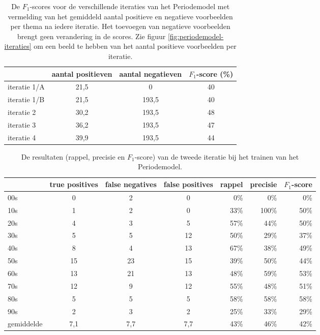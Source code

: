 \begin{table}
	\centering
	\renewcommand\arraystretch{1.2}
	\begin{tabular}{l|cc|c}
		\toprule
		& aantal positieven  &  aantal negatieven &  $F_1$-score (\%)\\
		\midrule
		iteratie 1/A & 21,5 & 0 & 40 \\
		iteratie 1/B & 21,5 & 193,5 & 40 \\
		iteratie 2 & 30,2 & 193,5 & 48 \\
		iteratie 3 & 36,2 & 193,5 & 47 \\
		iteratie 4 & 39,9 & 193,5 & 44 \\
		\bottomrule
	\end{tabular}
	\caption[$F_1$-scores voor de verschillende iteraties van het Periodemodel]{De $F_1$-scores voor de verschillende iteraties van het Periodemodel met vermelding van het gemiddeld aantal positieve en negatieve voorbeelden per thema na iedere iteratie. Het toevoegen van negatieve voorbeelden brengt geen verandering in de scores. Zie figuur \ref{fig:periodemodel-iteraties} om een beeld te hebben van het aantal positieve voorbeelden per iteratie.}
	\label{tab:validatie-periodemodel}
\end{table}

\begin{table}
	\centering
	\renewcommand\arraystretch{1.2}
	\begin{tabular}{l|ccc|rrr}
		\toprule
		& true positives  & false negatives & false positives & rappel & precisie & $F_1$-score \\ 
		\midrule
		00s & 0 & 2 & 0 & 0\% & 0\% & 0\% \\ 
		10s & 1 & 2 & 0 &  33\% & 100\% & 50\% \\ 
		20s & 4 & 3 & 5 & 57\% & 44\% & 50\% \\ 
		30s & 5 & 5 & 12 & 50\% & 29\% & 37\% \\ 
		40s & 8 & 4 & 13  & 67\% & 38\% & 49\% \\ 
		50s & 15 & 23 & 15  & 39\% & 50\% & 44\% \\ 
		60s & 13 & 21 & 13  & 48\% & 59\% & 53\% \\ 
		70s & 12 & 9 & 12  & 55\% & 48\% & 51\% \\ 
		80s & 5 & 5 & 5  & 58\% & 58\% & 58\% \\ 
		90s & 2 & 3 & 2  & 25\% & 33\% & 29\% \\ 
		\midrule
		gemiddelde & 7,1 & 7,7 & 7,7  & 43\% & 46\% & 42\% \\ 
		\bottomrule
	\end{tabular} 
	\caption[Scores van de tweede iteratie van het Periodemodel]{De resultaten (rappel, precisie en $F_1$-score) van de tweede iteratie bij het trainen van het Periodemodel.}
	\label{tab:validatie-iteratie2-periodemodel}
\end{table}

